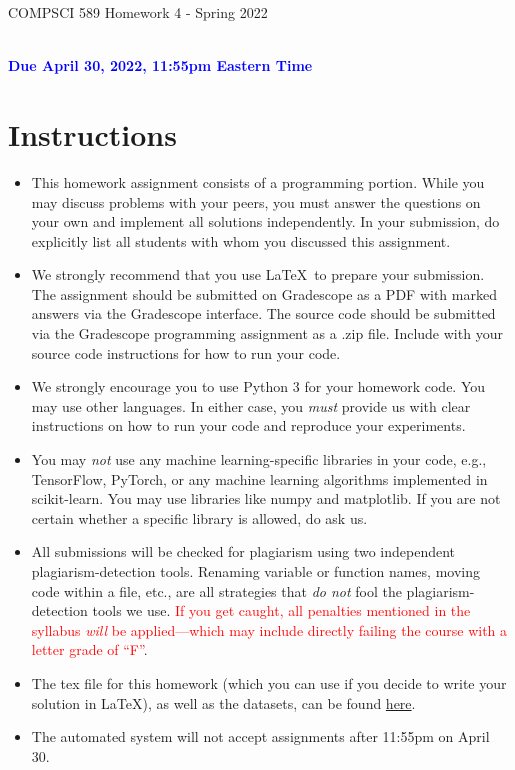 \documentclass[letterpaper]{article}
\newcommand{\HIGHLIGHT}[1]{\textcolor{blue}{\textbf{#1}}}
\begin{document}
\newpage
\begin{center}
    \begin{Large}
    COMPSCI 589 Homework 4 - Spring 2022
    \end{Large}
    \\
    \HIGHLIGHT{Due April 30, 2022, 11:55pm Eastern Time}
\end{center}



\vspace{0.25in}
\section{Instructions}

\begin{itemize}
    \item This homework assignment consists of a programming portion. While you may discuss problems with your peers, you must answer the questions on your own and implement all solutions independently. In your submission, do explicitly list all students with whom you discussed this assignment. 
    \item We strongly recommend that you use \LaTeX~to prepare your submission. The assignment should be submitted on Gradescope as a PDF with marked answers via the Gradescope interface. The source code should be submitted via the Gradescope programming assignment as a .zip file. Include with your source code instructions for how to run your code. 
    \item We strongly encourage you to use Python 3 for your homework code. You may use other languages. In either case, you \textit{must} provide us with clear instructions on how to run your code and reproduce your experiments. 
    \item You may \textit{not} use any machine learning-specific libraries in your code, e.g., TensorFlow, PyTorch, or any machine learning algorithms implemented in scikit-learn. You may use libraries like numpy and matplotlib. If you are not certain whether a specific library is allowed, do ask us.
    \item All submissions will be checked for plagiarism using two independent plagiarism-detection tools. Renaming variable or function names, moving code within a file, etc., are all strategies that \textit{do not} fool the plagiarism-detection tools we use. \textcolor{red}{If you get caught, all penalties mentioned in the syllabus \textit{will} be applied---which may include directly failing the course with a letter grade of ``F''}.
    \item The tex file for this homework (which you can use if you decide to write your solution in \LaTeX), as well as the datasets, can be found \href{https://people.cs.umass.edu/~bsilva/courses/CMPSCI_589/Spring2022/homeworks/hw4.zip}{here}.
    \item The automated system will not accept assignments after 11:55pm on April 30. 
\end{itemize}
\end{document}
